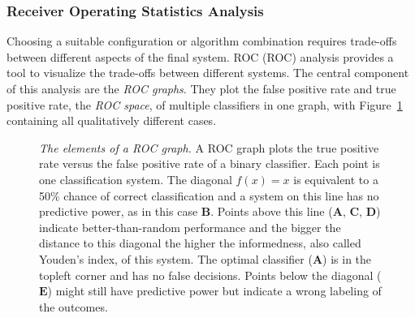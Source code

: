 \subsubsection{Receiver Operating Statistics Analysis}

Choosing a suitable configuration or algorithm combination requires trade-offs between different aspects of the final system.
\acrlong{ROC} (\acrshort{ROC}) analysis\cite{fawcett_2006} provides a tool to visualize the trade-offs between different systems.
The central component of this analysis are the \emph{\acrshort{ROC} graphs}.
They plot the false positive rate and true positive rate, the \emph{\acrshort{ROC} space}, of multiple classifiers in one graph, with Figure~\ref{fig:roc_graph} containing all qualitatively different cases.
\begin{figure}[H]
\caption[The elements of a \acrshort{ROC} graph]{\emph{The elements of a \acrshort{ROC} graph.} A \acrshort{ROC} graph plots the true positive rate versus the false positive rate of a binary classifier. Each point is one classification system. The diagonal $f(x) = x$ is equivalent to a 50\% chance of correct classification and a system on this line has no predictive power, as in this case $\mathbf{B}$. Points above this line ($\mathbf{A}$, $\mathbf{C}$, $\mathbf{D}$) indicate better-than-random performance and the bigger the distance to this diagonal the higher the informedness, also called Youden's index, of this system. The optimal classifier ($\mathbf{A}$) is in the topleft corner and has no false decisions. Points below the diagonal ($\mathbf{E}$) might still have predictive power but indicate a wrong labeling of the outcomes.}\label{fig:roc_graph}
\end{figure}

